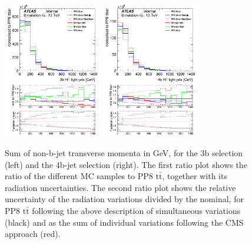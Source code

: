 \begin{figure}[!htb]
\centering
\includegraphics[width=0.38\textwidth]{Plots/ttbb/hisgenHTljets_4j3t__div}
\includegraphics[width=0.38\textwidth]{Plots/ttbb/hisgenHTljets_4j4t__div}
  \caption{Sum of non-b-jet transverse momenta in GeV, for the 3b selection (left) and the 4b-jet selection (right). The first ratio plot shows the ratio of the different MC samples to PP8 $\mathrm{t\bar{t}}$, together with its radiation uncertainties. The second ratio plot shows the relative uncertainty of the radiation variations divided by the nominal, for PP8 $\mathrm{t\bar{t}}$ following the above description of simultaneous variations (black) and as the sum of individual variations following the CMS approach (red). \label{ttbb:HTljets}}
\end{figure}

